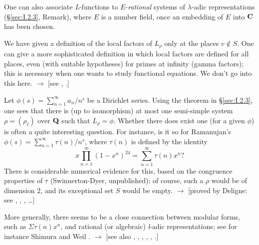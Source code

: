 \begin{remarks}
\begin{nlist}
\item One can also associate \textit{L}-functions to
$E$-\emph{rational} systems of $\lambda$-adic representations
(\S\ref{sec:I.2.3}, Remark), where $E$ is a number field, once an
embedding of $E$ into $\mathbf{C}$ has been chosen.

\item We have given a definition of the local factors of $L_\rho$ only
at the places $v \notin S$.  One can give a more sophisticated
definition in which local factors are defined for all places, even
(with suitable hypotheses) for primes at infinity (gamma factors);
this is necessary when one wants to study functional equations.  We
don't go into this here.  $\longrightarrow$ [see \cite{deligne-valeurs},
\cite{serre-facteurs}.]

\item Let $\phi(s) = \sum\limits_{n=1}^{\infty} a_n/n^s$ be a
Dirichlet series.  Using the theorem in \S\ref{sec:I.2.3}, one sees
that there is (up to isomorphism) at most one semi-simple system
$\rho = (\rho_\ell)$ over $\mathbf{Q}$ such that $L_\rho = \phi$.  Whether
there does exist one (for a given $\phi$) is often a quite interesting
question.  For instance, is it so for Ramanujan's
$\phi(s) = \sum\limits_{n=1}^{\infty} \tau(n)/n^s$, where $\tau(n)$ is
defined by the identity
\[
x \prod_{n=1}^{\infty} (1 - x^n)^{24} = \sum_{n=1}^{\infty} \tau(n)x^n?
\]
There is considerable numerical evidence for this, based on the
congruence properties of $\tau$ (Swinnerton-Dyer, unpublished); of
course, such a $\rho$ would be of dimension $2$, and its exceptional
set $S$ would be empty.  $\longrightarrow$ [proved by Deligne: see
\cite{carayol}, \cite{deligne-formes}, \cite{langlands-modular},
\dots]

More generally, there seems to be a close connection between modular
forms, such as $\Sigma\tau(n)x^n$, and rational (or algebraic)
\textit{l}-adic representations; see for instance Shimura
\cite{shimura-recip} and Weil \cite{weil-dirichlet}.  $\longrightarrow$
[see also \cite{carayol}, \cite{deligne-valeurs},
\cite{langlands-modular}, \cite{langlands-automorphic}, \cite{ohta},
\cite{wiles}.]
\end{nlist}
\end{remarks}

